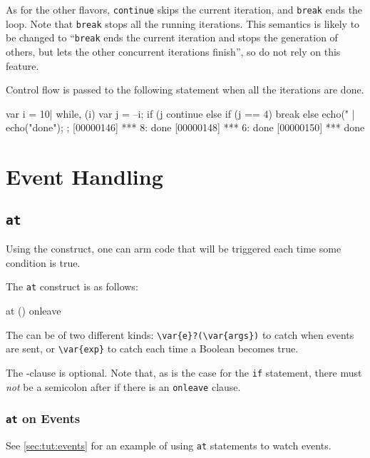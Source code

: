As for the other flavors, \lstinline|continue| skips the current iteration,
and \lstinline|break| ends the loop.  Note that \lstinline|break| stops all
the running iterations.  This semantics is likely to be changed to
``\lstinline|break| ends the current iteration and stops the generation of
others, but lets the other concurrent iterations finish'', so do not rely on
this feature.

Control flow is passed to the following statement when all the iterations
are done.

\begin{urbiscript}
{
  var i = 10|
  while, (i)
  {
    var j = --i;
    if (j %
      continue
    else if (j == 4)
      break
    else
      echo("%
  }|
  echo("done");
};
[00000146] *** 8: done
[00000148] *** 6: done
[00000150] *** done
\end{urbiscript}


\section{Event Handling}

\subsection{\lstinline'at'}
\label{sec:lang:at}
Using the  construct, one can arm code that will be
triggered each time some condition is true.

The \lstinline'at' construct is as follows:

\begin{urbiunchecked}
at ()
onleave
\end{urbiunchecked}

The  can be of two different kinds:
\lstinline|\var{e}?(\var{args})| to catch when events are sent, or
\lstinline|\var{exp}| to catch each time a Boolean  becomes true.

The -clause is optional.  Note that, as is the case for
the \lstinline|if| statement, there must \emph{not} be a semicolon after
 if there is an \lstinline|onleave| clause.

\subsubsection{\lstinline'at' on Events}
See \autoref{sec:tut:events} for an example of using \lstinline|at|
statements to watch events.

